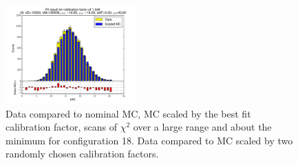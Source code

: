 \begin{figure}[htbp]
\begin{center}
\includegraphics[width=0.45\textwidth]{../FIGURES/18/FIG_Fit_result_for_calibration_factor_of_1_046.pdf} 
\caption{Data compared to nominal MC, MC scaled by the best fit calibration factor, scans of $\chi^2$ over a large range and about the minimum for configuration 18. Data compared to MC scaled by two randomly chosen calibration factors.} 
\label{tab:best_18} 
\end{center} \end{figure} 

